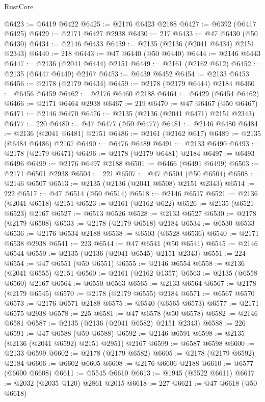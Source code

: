 \begin{lexlean}{RustCore}
\begin{coremodule}
@6423 := @6419 @6422
@6425 := @2176 @6423 @2188
@6427 := @6392 (@6417 @6425)
@6429 := @2171 @6427 @2938
@6430 := 217
@6433 := @47 @6430 (@50 @6430)
@6434 := @2146 @6433
@6439 := @2135 (@2136 (@2041 @6434) @2151 @2343)
@6440 := 218
@6443 := @47 @6440 (@50 @6440)
@6444 := @2146 @6443
@6447 := @2136 (@2041 @6444) @2151
@6449 := @2161 (@2162 @612)
@6452 := @2135 (@6447 @6449) @2167
@6453 := @6439 @6452
@6454 := @2133 @6453
@6456 := @2178 (@2179 @6434)
@6459 := @2178 (@2179 @6444) @2184
@6460 := @6456 @6459
@6462 := @2176 @6460 @2188
@6464 := @6429 (@6454 @6462)
@6466 := @2171 @6464 @2938
@6467 := 219
@6470 := @47 @6467 (@50 @6467)
@6471 := @2146 @6470
@6476 := @2135 (@2136 (@2041 @6471) @2151 @2343)
@6477 := 220
@6480 := @47 @6477 (@50 @6477)
@6481 := @2146 @6480
@6484 := @2136 (@2041 @6481) @2151
@6486 := @2161 (@2162 @617)
@6489 := @2135 (@6484 @6486) @2167
@6490 := @6476 @6489
@6491 := @2133 @6490
@6493 := @2178 (@2179 @6471)
@6496 := @2178 (@2179 @6481) @2184
@6497 := @6493 @6496
@6499 := @2176 @6497 @2188
@6501 := @6466 (@6491 @6499)
@6503 := @2171 @6501 @2938
@6504 := 221
@6507 := @47 @6504 (@50 @6504)
@6508 := @2146 @6507
@6513 := @2135 (@2136 (@2041 @6508) @2151 @2343)
@6514 := 222
@6517 := @47 @6514 (@50 @6514)
@6518 := @2146 @6517
@6521 := @2136 (@2041 @6518) @2151
@6523 := @2161 (@2162 @622)
@6526 := @2135 (@6521 @6523) @2167
@6527 := @6513 @6526
@6528 := @2133 @6527
@6530 := @2178 (@2179 @6508)
@6533 := @2178 (@2179 @6518) @2184
@6534 := @6530 @6533
@6536 := @2176 @6534 @2188
@6538 := @6503 (@6528 @6536)
@6540 := @2171 @6538 @2938
@6541 := 223
@6544 := @47 @6541 (@50 @6541)
@6545 := @2146 @6544
@6550 := @2135 (@2136 (@2041 @6545) @2151 @2343)
@6551 := 224
@6554 := @47 @6551 (@50 @6551)
@6555 := @2146 @6554
@6558 := @2136 (@2041 @6555) @2151
@6560 := @2161 (@2162 @1357)
@6563 := @2135 (@6558 @6560) @2167
@6564 := @6550 @6563
@6565 := @2133 @6564
@6567 := @2178 (@2179 @6545)
@6570 := @2178 (@2179 @6555) @2184
@6571 := @6567 @6570
@6573 := @2176 @6571 @2188
@6575 := @6540 (@6565 @6573)
@6577 := @2171 @6575 @2938
@6578 := 225
@6581 := @47 @6578 (@50 @6578)
@6582 := @2146 @6581
@6587 := @2135 (@2136 (@2041 @6582) @2151 @2343)
@6588 := 226
@6591 := @47 @6588 (@50 @6588)
@6592 := @2146 @6591
@6598 := @2135 (@2136 (@2041 @6592) @2151 @2951) @2167
@6599 := @6587 @6598
@6600 := @2133 @6599
@6602 := @2178 (@2179 @6582)
@6605 := @2178 (@2179 @6592) @2184
@6606 := @6602 @6605
@6608 := @2176 @6606 @2188
@6610 := @6577 (@6600 @6608)
@6611 := @5545 @6610
@6613 := @1945 (@5522 @6611)
@6617 := @2032 (@2035 @120) @2861 @2015
@6618 := 227
@6621 := @47 @6618 (@50 @6618)

\end{coremodule}
\end{lexlean}
